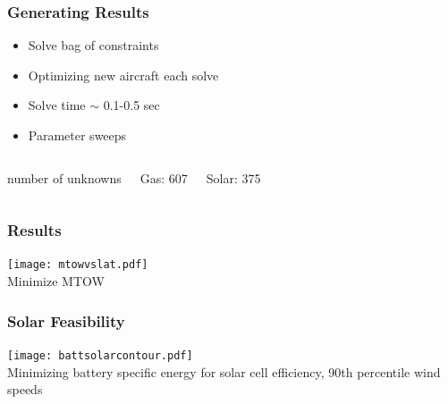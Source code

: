 \documentclass{beamer}
\begin{document}
\begin{frame}
\frametitle{Generating Results}

\begin{itemize}
        \pause
    \item Solve bag of constraints
        \pause
    \item Optimizing new aircraft each solve
        \pause
    \item Solve time $\sim$ 0.1-0.5 sec
        \pause
    \item Parameter sweeps
    \end{itemize}
    
    \pause
    \begin{centering}
    \begin{columns}
    \begin{center}
       number of unknowns
    \end{center}
    \begin{columns}
        \begin{center}
        Gas: 607 
        \end{center}
        
        \begin{center}
        Solar: 375
        \end{center}
        
    \end{columns}
    \end{columns}
    \end{centering}

\end{frame}


\begin{frame}
    \frametitle{Results}

    \pause
    \begin{center}
    \texttt{[image: mtowvslat.pdf]} \\
    Minimize MTOW
    \end{center}

\end{frame}

\begin{frame}
    \frametitle{Solar Feasibility}

    \pause
    \begin{center}
    \texttt{[image: battsolarcontour.pdf]} \\
    Minimizing battery specific energy for solar cell efficiency, 90th percentile wind speeds
    \end{center}

\end{frame}
\end{document}
